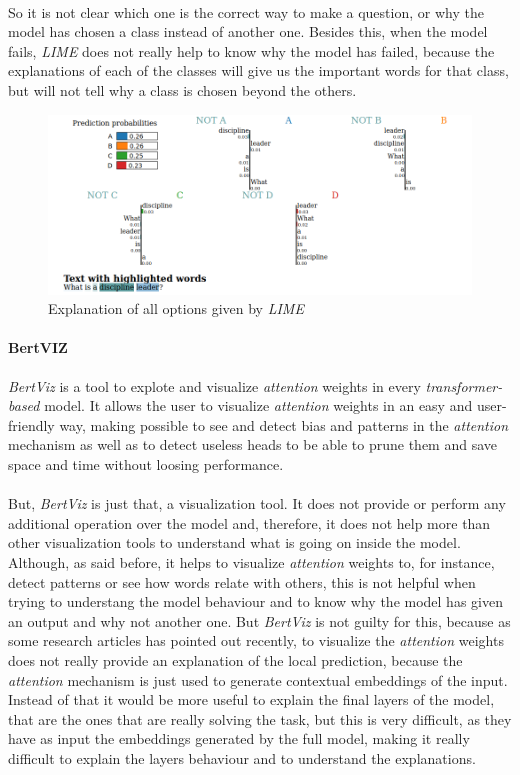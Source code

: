 \paragraph{}
So it is not clear which one is the correct way to make a question, or why the model has chosen a class instead of another one.
Besides this, when the model fails, \emph{LIME} does not really help to know why the model has failed, because the explanations of each of the classes will give us the important words for that class, but will not tell why a class is chosen beyond the others. 
\begin{figure}[!h]
	\centering
	\includegraphics[scale=0.35]{images/conclussionLime}
	\caption{Explanation of all options given by \emph{LIME}}
	\label{fig:conclussionLime}
\end{figure}
\paragraph{BertVIZ} \emph{BertViz} is a tool to explote and visualize \emph{attention} weights in every \emph{transformer-based} model. It allows the user to visualize \emph{attention} weights in an easy and user-friendly way, making possible to see and detect bias and patterns in the \emph{attention} mechanism as well as to detect useless heads to be able to prune them and save space and time without loosing performance.
\paragraph{}
But, \emph{BertViz} is just that, a visualization tool. It does not provide or perform any additional operation over the model and, therefore, it does not help more than other visualization tools to understand what is going on inside the model. Although, as said before, it helps to visualize \emph{attention} weights to, for instance, detect patterns or see how words relate with others, this is not helpful when trying to understang the model behaviour and to know why the model has given an output and why not another one. But \emph{BertViz} is not guilty for this, because as some research articles\cite{} has pointed out recently, to visualize the \emph{attention} weights does not really provide an explanation of the local prediction, because the \emph{attention} mechanism is just used to generate contextual embeddings of the input. Instead of that it would be more useful to explain the final layers of the model, that are the ones that are really solving the task, but this is very difficult, as they have as input the embeddings generated by the full model, making it really difficult to explain the layers behaviour and to understand the explanations.

